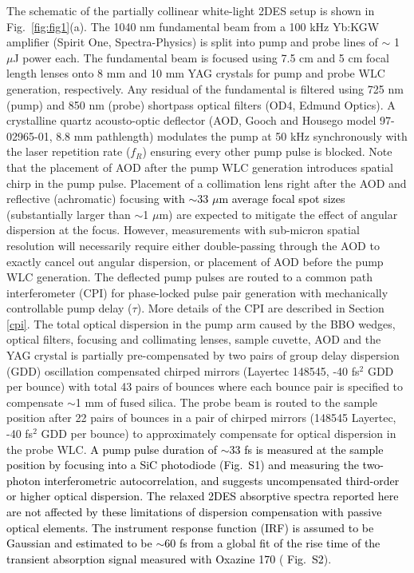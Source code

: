 \documentclass[%
aip,
amsmath,amssymb,
preprint,%
]{revtex4-2}
\newcommand*{\vt}[1]{\textcolor{black}{ #1}}
\newcommand*{\si}[1]{\textcolor{black}{ #1}}
\begin{document}
The schematic of the partially collinear white-light 2DES setup is shown in {Fig.~\ref{fig:fig1}(a)}. The 1040 nm fundamental beam from a 100 kHz Yb:KGW amplifier (Spirit One, Spectra-Physics) is split into pump and probe lines of $\sim$ 1 $\mu$J power each. The fundamental beam is focused using 7.5 cm and 5 cm focal length lenses onto 8 mm and 10 mm YAG crystals for pump and probe WLC generation, respectively. Any residual of the fundamental is filtered using 725 nm (pump) and 850 nm (probe) shortpass optical filters (OD4, Edmund Optics). A crystalline quartz acousto-optic deflector (AOD, Gooch and Housego model 97-02965-01, 8.8 mm pathlength) modulates the pump at 50 kHz synchronously with the laser repetition rate ($f_R$) ensuring every other pump pulse is blocked. Note that the placement of AOD after the pump WLC generation introduces spatial chirp in the pump pulse. Placement of a collimation lens right after the AOD and reflective (achromatic) focusing \vt{with $\sim$33 $\mu$m average focal spot sizes} (substantially larger than $\sim$1 $\mu$m) are expected to mitigate\cite{Sahu2023} the effect of angular dispersion at the focus. However, measurements with sub-micron spatial resolution will necessarily require either double-passing\cite{Jefferts2005} through the AOD to exactly cancel out angular dispersion, or placement of AOD before the pump WLC generation. The deflected pump pulses are routed to a common path interferometer\cite{Cerullo2014} (CPI) for phase-locked pulse pair generation with mechanically controllable pump delay ($\tau$). More details of the CPI are described in Section \ref{cpi}. The total optical dispersion in the pump arm caused by the BBO wedges, optical filters, focusing and collimating lenses, sample cuvette, AOD and the YAG crystal is partially pre-compensated by two pairs of group delay dispersion (GDD) oscillation compensated chirped mirrors (Layertec 148545, -40 fs$^2$ GDD per bounce) with total 43 pairs of bounces where each bounce pair is specified to compensate $\sim$1 mm of fused silica. The probe beam is routed to the sample position after 22 pairs of bounces in a pair of chirped mirrors (148545 Layertec, -40 fs$^2$ GDD per bounce) to approximately compensate for optical dispersion in the probe WLC. \vt{A pump pulse duration of $\sim$33 fs is measured at the sample position by focusing into a SiC photodiode (Fig.~S1) and measuring the two-photon interferometric autocorrelation, and suggests uncompensated third-order or higher optical dispersion. The relaxed 2DES absorptive spectra reported here are not affected by these limitations of dispersion compensation with passive optical elements. The instrument response function (IRF) is assumed to be Gaussian and estimated to be \si{$\sim$60 fs} from a global fit of the rise time of the transient absorption signal measured with Oxazine 170} (\si{Fig.~S2}).\\
\end{document}
